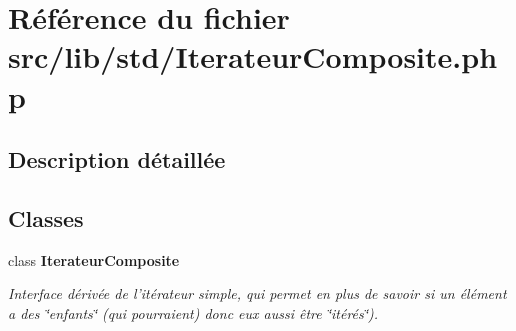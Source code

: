\section{Référence du fichier src/lib/std/IterateurComposite.php}
\label{_iterateur_composite_8php}


\subsection{Description détaillée}


\subsection*{Classes}
\begin{CompactItemize}
\item 
class {\bf IterateurComposite}
\begin{CompactList}\small\item\em Interface dérivée de l'itérateur simple, qui permet en plus de savoir si un élément a des \char`\"{}enfants\char`\"{} (qui pourraient) donc eux aussi être \char`\"{}itérés\char`\"{}). \item\end{CompactList}\end{CompactItemize}
